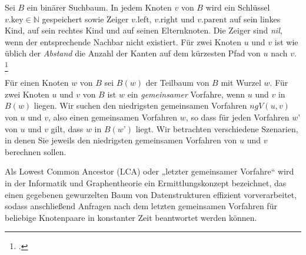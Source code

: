 \documentclass{bschlangaul-aufgabe}
\begin{document}

Sei $B$ ein binärer Suchbaum. In jedem Knoten $v$ von $B$ wird ein
Schlüssel $v.\text{key} \in \mathbb{N}$ gespeichert sowie Zeiger
$v.\text{left}$, $v.\text{right}$ und $v.\text{parent}$ auf sein linkes
Kind, auf sein rechtes Kind und auf seinen Elternknoten. Die Zeiger sind
\emph{nil}, wenn der entsprechende Nachbar nicht existiert. Für zwei
Knoten $u$ und $v$ ist wie üblich der \emph{Abstand} die Anzahl der
Kanten auf dem kürzesten Pfad von $u$ nach $v$.
\footcite{examen:66115:2020:03}

Für einen Knoten $w$ von $B$ sei $B(w)$ der Teilbaum von $B$ mit Wurzel
$w$. Für zwei Knoten $u$ und $v$ von $B$ ist $w$ ein \emph{gemeinsamer}
Vorfahre, wenn $u$ und $v$ in $B(w)$ liegen. Wir suchen den niedrigsten
gemeinsamen Vorfahren $ngV(u,v)$ von $u$ und $v$, also einen gemeinsamen
Vorfahren $w$, so dass für jeden Vorfahren $w’$ von $u$ und $v$ gilt,
dass $w$ in $B(w’)$ liegt. Wir betrachten verschiedene Szenarien, in
denen Sie jeweils den niedrigsten gemeinsamen Vorfahren von $u$ und $v$
berechnen sollen.

\begin{bExkurs}
Als Lowest Common Ancestor (LCA) oder „letzter gemeinsamer Vorfahre“
wird in der Informatik und Graphentheorie ein Ermittlungskonzept
bezeichnet, das einen gegebenen gewurzelten Baum von Datenstrukturen
effizient vorverarbeitet, sodass anschließend Anfragen nach dem letzten
gemeinsamen Vorfahren für beliebige Knotenpaare in konstanter Zeit
beantwortet werden können.
\end{bExkurs}
\end{document}
